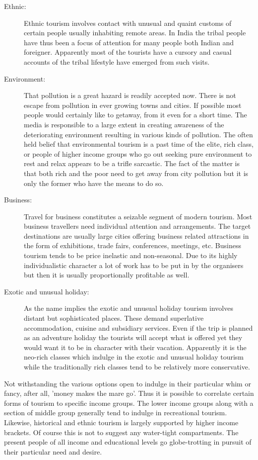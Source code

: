 \begin{description}
\item[Ethnic:] Ethnic tourism involves contact with unusual and quaint customs of certain people usually inhabiting remote areas. In India the tribal people have thus been a focus of attention for many people both Indian and foreigner. Apparently most of the tourists have a cursory and casual accounts of the tribal lifestyle have emerged from such visits.

\item[Environment:] That pollution is a great hazard is readily accepted now. There is not escape from pollution in ever growing towns and cities. If possible most people would certainly like to getaway, from it even for a short time. The media is responsible to a large extent in creating awareness of the deteriorating environment resulting in various kinds of pollution. The often held belief that environmental tourism is a past time of the elite, rich class, or people of higher income groups who go out seeking pure environment to rest and relax appears to be a trifle sarcastic. The fact of the matter is that both rich and the poor need to get away from city pollution but it is only the former who have the means to do so.

\item[Business:] Travel for business constitutes a seizable segment of modern tourism. Most business travellers need individual attention and arrangements. The target destinations are usually large cities offering business related attractions in the form of exhibitions, trade fairs, conferences, meetings, etc. Business tourism tends to be price inelastic and non-seasonal. Due to its highly individualistic character a lot of work has to be put in by the organisers but then it is usually proportionally profitable as well.

\item[Exotic and unusual holiday:] As the name implies the exotic and unusual holiday tourism involves distant but sophisticated places. These demand superlative accommodation, cuisine and subsidiary services. Even if the trip is planned as an adventure holiday the tourists will accept what is offered yet they would want it to be in character with their vacation. Apparently it is the neo-rich classes which indulge in the exotic and unusual holiday tourism while the traditionally rich classes tend to be relatively more conservative.

\end{description}

Not withstanding the various options open to indulge in their particular whim or fancy, after all, 'money makes the mare go'. Thus it is possible to correlate certain forms of tourism to specific income groups. The lower income groups along with a section of middle group generally tend to indulge in recreational tourism. Likewise, historical and ethnic tourism is largely supported by higher income brackets. Of course this is not to suggest any water-tight compartments. The present people of all income and educational levels go globe-trotting in pursuit of their particular need and desire.

